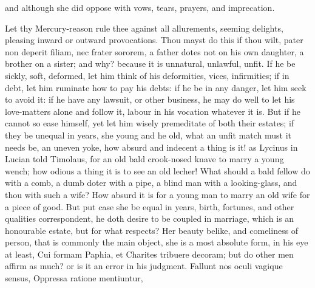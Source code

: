 {and although she did oppose with vows, tears, prayers, and imprecation.

Let thy Mercury-reason rule thee against all allurements, seeming
delights, pleasing inward or outward provocations. Thou mayst do this
if thou wilt, pater non deperit filiam, nec frater sororem, a father
dotes not on his own daughter, a brother on a sister; and why? because
it is unnatural, unlawful, unfit. If he be sickly, soft, deformed, let
him think of his deformities, vices, infirmities; if in debt, let him
ruminate how to pay his debts: if he be in any danger, let him seek to
avoid it: if he have any lawsuit, or other business, he may do well to
let his love-matters alone and follow it, labour in his vocation
whatever it is. But if he cannot so ease himself, yet let him wisely
premeditate of both their estates; if they be unequal in years, she
young and he old, what an unfit match must it needs be, an uneven yoke,
how absurd and indecent a thing is it! as Lycinus in Lucian told
Timolaus, for an old bald crook-nosed knave to marry a young wench; how
odious a thing it is to see an old lecher! What should a bald fellow do
with a comb, a dumb doter with a pipe, a blind man with a
looking-glass, and thou with such a wife? How absurd it is for a young
man to marry an old wife for a piece of good. But put case she be equal
in years, birth, fortunes, and other qualities correspondent, he doth
desire to be coupled in marriage, which is an honourable estate, but
for what respects? Her beauty belike, and comeliness of person, that is
commonly the main object, she is a most absolute form, in his eye at
least, Cui formam Paphia, et Charites tribuere decoram; but do other
men affirm as much? or is it an error in his judgment.
Fallunt nos oculi vagique sensus,
Oppressa ratione mentiuntur,

}
